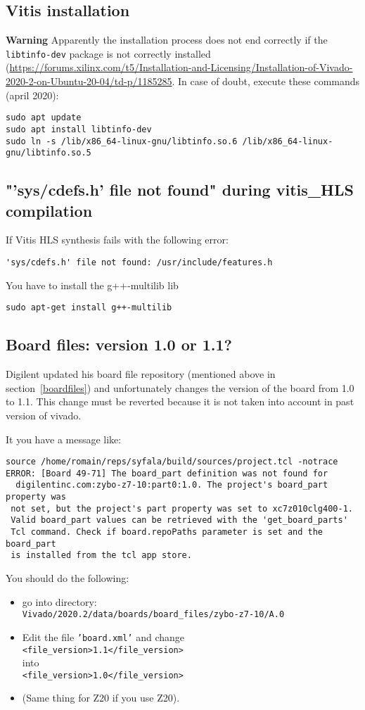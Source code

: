 \subsection{Vitis installation}
{\bf Warning} Apparently the installation process does not end correctly if the {\tt libtinfo-dev} package is not correctly installed (\url{https://forums.xilinx.com/t5/Installation-and-Licensing/Installation-of-Vivado-2020-2-on-Ubuntu-20-04/td-p/1185285}. In case of doubt, execute these commands (april 2020):
\begin{verbatim}
sudo apt update
sudo apt install libtinfo-dev
sudo ln -s /lib/x86_64-linux-gnu/libtinfo.so.6 /lib/x86_64-linux-gnu/libtinfo.so.5
\end{verbatim}

\subsection{"'sys/cdefs.h' file not found" during vitis\_HLS compilation}
If Vitis HLS synthesis fails with the following error:
\begin{verbatim}
'sys/cdefs.h' file not found: /usr/include/features.h 
\end{verbatim}
You have to install the g++-multilib lib
\begin{verbatim}
sudo apt-get install g++-multilib
\end{verbatim}

\subsection{Board files: version 1.0 or 1.1?}
Digilent updated his board file repository (mentioned above in section~\ref{boardfiles}) and unfortunately changes the version of the board from 1.0 to 1.1. This change must be reverted because it is not taken into account in past version of vivado.

It you have a message like:
\begin{verbatim}
source /home/romain/reps/syfala/build/sources/project.tcl -notrace
ERROR: [Board 49-71] The board_part definition was not found for
  digilentinc.com:zybo-z7-10:part0:1.0. The project's board_part property was 
 not set, but the project's part property was set to xc7z010clg400-1. 
 Valid board_part values can be retrieved with the 'get_board_parts'
 Tcl command. Check if board.repoPaths parameter is set and the board_part 
 is installed from the tcl app store.
\end{verbatim}

You should do the following:
\begin{itemize}
  \item 
    go into directory:\\
    {\tt Vivado/2020.2/data/boards/board\_files/zybo-z7-10/A.0}
\item Edit the file {\tt 'board.xml'}
  and change\\
  {\tt <file\_version>1.1</file\_version>}\\ into\\ {\tt  <file\_version>1.0</file\_version>}
\item (Same thing for Z20 if you use Z20).
\end{itemize}
